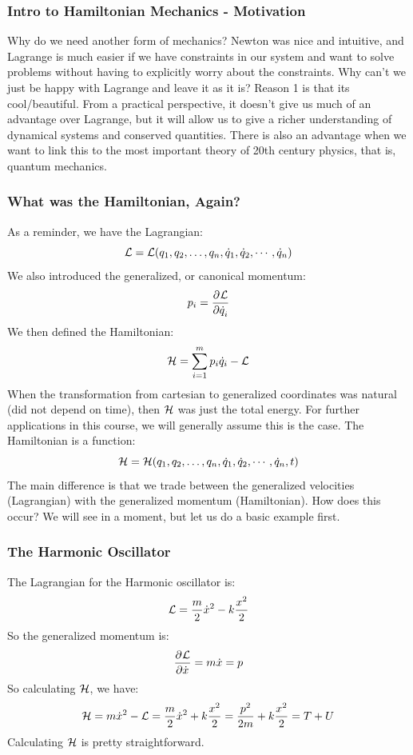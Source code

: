 \documentclass[../PHYS306Notes.tex]{subfiles}
\begin{document}
\subsubsection{Intro to Hamiltonian Mechanics - Motivation}
Why do we need another form of mechanics? Newton was nice and intuitive, and Lagrange is much easier if we have constraints in our system and want to solve problems without having to explicitly worry about the constraints. Why can't we just be happy with Lagrange and leave it as it is? Reason 1 is that its cool/beautiful. From a practical perspective, it doesn't give us much of an advantage over Lagrange, but it will allow us to give a richer understanding of dynamical systems and conserved quantities. There is also an advantage when we want to link this to the most important theory of 20th century physics, that is, quantum mechanics. 

\subsubsection{What was the Hamiltonian, Again?}
As a reminder, we have the Lagrangian:
\[\mathcal{L} = \mathcal{L}(q_1, q_2, \ldots, q_n, \dot{q}_1, \dot{q}_2, \cdots, \dot{q}_n)\]
We also introduced the generalized, or canonical momentum:
\[p_i = \dpd{\LL}{\dot{q}_i}\]
We then defined the Hamiltonian:
\[\mathcal{H} = \sum_{i=1}^mp_i\dot{q}_i - \mathcal{L}\]
When the transformation from cartesian to generalized coordinates was natural (did not depend on time), then $\mathcal{H}$ was just the total energy. For further applications in this course, we will generally assume this is the case. The Hamiltonian is a function:
\[\mathcal{H} = \mathcal{H}(q_1, q_2, \ldots, q_n, \dot{q}_1, \dot{q}_2, \cdots, \dot{q}_n, t)\]
The main difference is that we trade between the generalized velocities (Lagrangian) with the generalized momentum (Hamiltonian). How does this occur? We will see in a moment, but let us do a basic example first. 

\subsubsection{The Harmonic Oscillator}
The Lagrangian for the Harmonic oscillator is:
\[\mathcal{L} = \frac{m}{2}\dot{x}^2 - k\frac{x^2}{2}\]
So the generalized momentum is:
\[\dpd{\LL}{\dot{x}} = m\dot{x} = p\]
So calculating $\mathcal{H}$, we have:
\[\mathcal{H} = m\dot{x}^2 - \mathcal{L} = \frac{m}{2}\dot{x}^2 + k\frac{x^2}{2} = \frac{p^2}{2m} + k\frac{x^2}{2} =  T + U\]
Calculating $\mathcal{H}$ is pretty straightforward.
\end{document}
